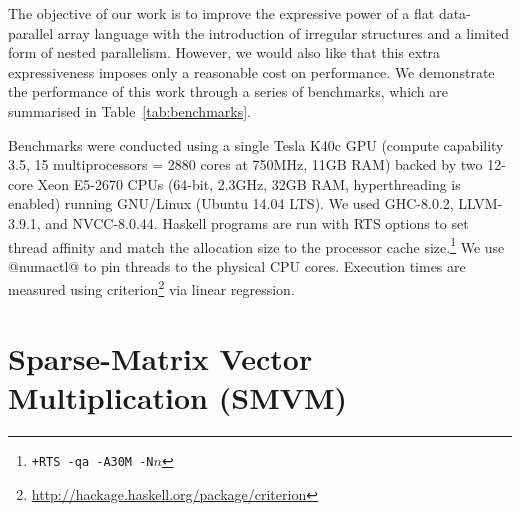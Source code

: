 The objective of our work is to improve the expressive power of a flat
data-parallel array language with the introduction of irregular structures and a
limited form of nested parallelism. However, we would also like that this extra
expressiveness imposes only a reasonable cost on performance. We demonstrate the
performance of this work through a series of benchmarks, which are summarised in
Table~\ref{tab:benchmarks}.

Benchmarks were conducted using a single Tesla K40c GPU (compute capability 3.5,
15 multiprocessors = 2880 cores at 750MHz, 11GB RAM) backed by two 12-core Xeon
E5-2670 CPUs (64-bit, 2.3GHz, 32GB RAM, hyperthreading is enabled) running
GNU/Linux (Ubuntu 14.04 LTS). We used GHC-8.0.2, LLVM-3.9.1, and NVCC-8.0.44.
Haskell programs are run with RTS options to set thread affinity and match the
allocation size to the processor cache size.\footnote{\texttt{+RTS -qa -A30M
-N$n$}} We use @numactl@ to pin threads to the physical CPU cores.
Execution times are measured using
criterion\footnote{\url{http://hackage.haskell.org/package/criterion}} via
linear regression.%


\section{Sparse-Matrix Vector Multiplication (SMVM)}

